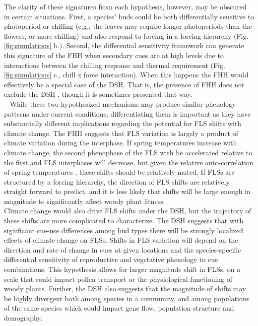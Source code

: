 \documentclass[11pt]{article}\usepackage[]{graphicx}\usepackage[]{color}
\begin{document}
\noindent The clarity of these signatures from each hypothesis, however, may be obscured in certain situations. First, a species' buds could be both differentially sensitive to photoperiod or chilling (e.g., the leaves may require longer photoperiods than the flowers, or more chilling) and also respond to forcing in a forcing hierarchy (Fig. \ref{fig:simulations} b.). Second, the differential sensitivity framework can generate this signature of the FHH when secondary cues are at high levels due to interactions between the chilling response and thermal requirement (Fig. \ref{fig:simulations} c., chill x force interaction). When this happens the FHH would effectively be a special case of the DSH. That is, the presence of FHH does not exclude the DSH \citep{Gariglio2006}, though it is sometimes presented that way.\\
 
\noident While these two hypothesized mechanisms may produce similar phenology patterns under current conditions, differentiating them %
is important as they have substantially different implications regarding the potential for FLS shifts with climate change. The FHH suggests that FLS variation is largely a product of climate variation during the interphase. If spring temperatures increase with climate change, the second phenophase of the FLS with be accelerated relative to the first and FLS interphases will decrease, but given the relative auto-correlation of spring temperatures \citep{Di-Cecco:2018aa}, these shifts should be relatively muted. If FLSs are structured by a forcing hierarchy, the direction of FLS shifts are relatively straight forward to predict, and it is less likely that shifts will be large enough in magnitude to significantly affect woody plant fitness.\\

\noindent Climate change would also drive FLS shifts under the DSH, but the trajectory of these shifts are more complicated to characterize. The DSH suggests that with significant cue-use differences among bud types there will be strongly localized effects of climate change on FLSs. Shifts in FLS variation will depend on the direction and rate of change in cues at given locations and the species-specific differential sensitivity of reproductive and vegetative phenology to cue combinations. This hypothesis allows for larger magnitude shift in FLSs, on a scale that could impact pollen transport or the physiological functioning of woody plants. Further, the DSH also suggests that the magnitude of shifts may be highly divergent both among species in a community, and among populations of the same species which could impact gene flow, population structure and demography.\\
\end{document}
